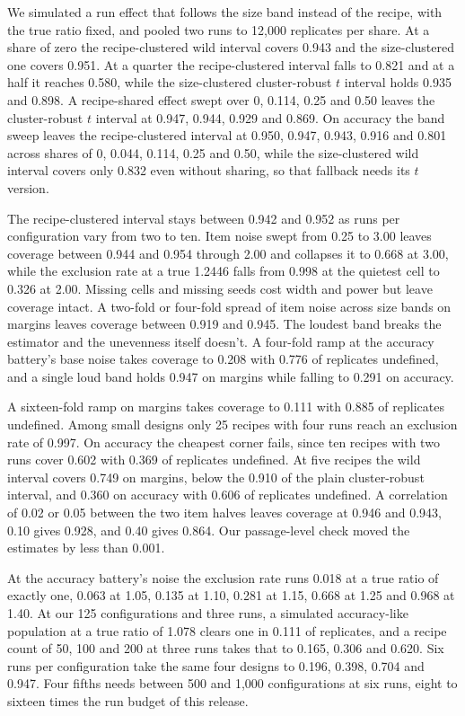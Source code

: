 We simulated a run effect that follows the size band instead of the recipe, with the true ratio fixed, and pooled two runs to 12,000 replicates per share. At a share of zero the recipe-clustered wild interval covers 0.943 and the size-clustered one covers 0.951. At a quarter the recipe-clustered interval falls to 0.821 and at a half it reaches 0.580, while the size-clustered cluster-robust $t$ interval holds 0.935 and 0.898. A recipe-shared effect swept over 0, 0.114, 0.25 and 0.50 leaves the cluster-robust $t$ interval at 0.947, 0.944, 0.929 and 0.869. On accuracy the band sweep leaves the recipe-clustered interval at 0.950, 0.947, 0.943, 0.916 and 0.801 across shares of 0, 0.044, 0.114, 0.25 and 0.50, while the size-clustered wild interval covers only 0.832 even without sharing, so that fallback needs its $t$ version.

The recipe-clustered interval stays between 0.942 and 0.952 as runs per configuration vary from two to ten. Item noise swept from 0.25 to 3.00 leaves coverage between 0.944 and 0.954 through 2.00 and collapses it to 0.668 at 3.00, while the exclusion rate at a true 1.2446 falls from 0.998 at the quietest cell to 0.326 at 2.00. Missing cells and missing seeds cost width and power but leave coverage intact. A two-fold or four-fold spread of item noise across size bands on margins leaves coverage between 0.919 and 0.945. The loudest band breaks the estimator and the unevenness itself doesn't. A four-fold ramp at the accuracy battery's base noise takes coverage to 0.208 with 0.776 of replicates undefined, and a single loud band holds 0.947 on margins while falling to 0.291 on accuracy.

A sixteen-fold ramp on margins takes coverage to 0.111 with 0.885 of replicates undefined. Among small designs only 25 recipes with four runs reach an exclusion rate of 0.997. On accuracy the cheapest corner fails, since ten recipes with two runs cover 0.602 with 0.369 of replicates undefined. At five recipes the wild interval covers 0.749 on margins, below the 0.910 of the plain cluster-robust interval, and 0.360 on accuracy with 0.606 of replicates undefined. A correlation of 0.02 or 0.05 between the two item halves leaves coverage at 0.946 and 0.943, 0.10 gives 0.928, and 0.40 gives 0.864. Our passage-level check moved the estimates by less than 0.001.

At the accuracy battery's noise the exclusion rate runs 0.018 at a true ratio of exactly one, 0.063 at 1.05, 0.135 at 1.10, 0.281 at 1.15, 0.668 at 1.25 and 0.968 at 1.40. At our 125 configurations and three runs, a simulated accuracy-like population at a true ratio of 1.078 clears one in 0.111 of replicates, and a recipe count of 50, 100 and 200 at three runs takes that to 0.165, 0.306 and 0.620. Six runs per configuration take the same four designs to 0.196, 0.398, 0.704 and 0.947. Four fifths needs between 500 and 1,000 configurations at six runs, eight to sixteen times the run budget of this release.

